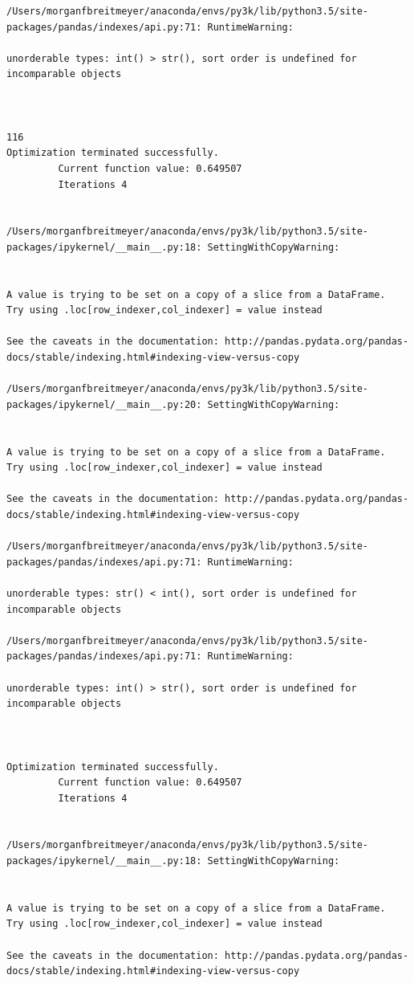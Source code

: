 \begin{lstlisting}
/Users/morganfbreitmeyer/anaconda/envs/py3k/lib/python3.5/site-packages/pandas/indexes/api.py:71: RuntimeWarning:

unorderable types: int() > str(), sort order is undefined for incomparable objects



116
Optimization terminated successfully.
         Current function value: 0.649507
         Iterations 4


/Users/morganfbreitmeyer/anaconda/envs/py3k/lib/python3.5/site-packages/ipykernel/__main__.py:18: SettingWithCopyWarning:


A value is trying to be set on a copy of a slice from a DataFrame.
Try using .loc[row_indexer,col_indexer] = value instead

See the caveats in the documentation: http://pandas.pydata.org/pandas-docs/stable/indexing.html#indexing-view-versus-copy

/Users/morganfbreitmeyer/anaconda/envs/py3k/lib/python3.5/site-packages/ipykernel/__main__.py:20: SettingWithCopyWarning:


A value is trying to be set on a copy of a slice from a DataFrame.
Try using .loc[row_indexer,col_indexer] = value instead

See the caveats in the documentation: http://pandas.pydata.org/pandas-docs/stable/indexing.html#indexing-view-versus-copy

/Users/morganfbreitmeyer/anaconda/envs/py3k/lib/python3.5/site-packages/pandas/indexes/api.py:71: RuntimeWarning:

unorderable types: str() < int(), sort order is undefined for incomparable objects

/Users/morganfbreitmeyer/anaconda/envs/py3k/lib/python3.5/site-packages/pandas/indexes/api.py:71: RuntimeWarning:

unorderable types: int() > str(), sort order is undefined for incomparable objects



Optimization terminated successfully.
         Current function value: 0.649507
         Iterations 4


/Users/morganfbreitmeyer/anaconda/envs/py3k/lib/python3.5/site-packages/ipykernel/__main__.py:18: SettingWithCopyWarning:


A value is trying to be set on a copy of a slice from a DataFrame.
Try using .loc[row_indexer,col_indexer] = value instead

See the caveats in the documentation: http://pandas.pydata.org/pandas-docs/stable/indexing.html#indexing-view-versus-copy


\end{lstlisting}
